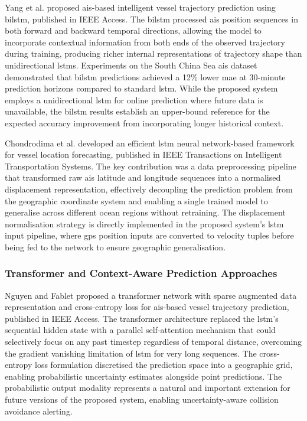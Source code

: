 Yang et al. \cite{Yang2022} proposed \gls{ais}-based intelligent vessel trajectory
prediction using \gls{bilstm}, published in IEEE Access. The
\gls{bilstm} processed \gls{ais} position sequences in both forward and backward temporal
directions, allowing the model to incorporate contextual information from both
ends of the observed trajectory during training, producing richer internal
representations of trajectory shape than unidirectional \glspl{lstm}. Experiments on
the South China Sea \gls{ais} dataset demonstrated that \gls{bilstm} predictions achieved
a 12\% lower \gls{mae} at 30-minute prediction horizons compared
to standard \gls{lstm}. While the proposed system employs a unidirectional \gls{lstm} for
online prediction where future data is unavailable, the \gls{bilstm} results establish
an upper-bound reference for the expected accuracy improvement from incorporating
longer historical context.
 
Chondrodima et al. \cite{Chondrodima2023} developed an efficient \gls{lstm} neural
network-based framework for vessel location forecasting, published in IEEE
Transactions on Intelligent Transportation Systems. The key contribution was a
data preprocessing pipeline that transformed raw \gls{ais} latitude and longitude
sequences into a normalised displacement representation, effectively decoupling
the prediction problem from the geographic coordinate system and enabling a single
trained model to generalise across different ocean regions without retraining.
The displacement normalisation strategy is directly implemented in the proposed
system's \gls{lstm} input pipeline, where \gls{gps} position inputs are converted to velocity
tuples before being fed to the network to ensure geographic generalisation.
 
\subsubsection{\textbf{Transformer and Context-Aware Prediction Approaches}}
Nguyen and Fablet \cite{Nguyen2024} proposed a transformer network with sparse
augmented data representation and cross-entropy loss for \gls{ais}-based vessel trajectory
prediction, published in IEEE Access. The transformer architecture replaced the
\gls{lstm}'s sequential hidden state with a parallel self-attention mechanism that could
selectively focus on any past timestep regardless of temporal distance, overcoming
the gradient vanishing limitation of \gls{lstm} for very long sequences. The cross-entropy
loss formulation discretised the prediction space into a geographic grid, enabling
probabilistic uncertainty estimates alongside point predictions. The probabilistic
output modality represents a natural and important extension for future versions
of the proposed system, enabling uncertainty-aware collision avoidance alerting.
 
